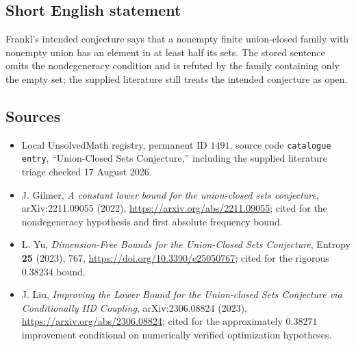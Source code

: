 \documentclass[11pt]{article}
\begin{document}
\subsection{Short English statement}
Frankl's intended conjecture says that a nonempty finite union-closed family with nonempty union has an element in at least half its sets. The stored sentence omits the nondegeneracy condition and is refuted by the family containing only the empty set; the supplied literature still treats the intended conjecture as open.
\subsection{Sources}
\begin{itemize}
\item Local UnsolvedMath registry, permanent ID $1491$, source code \texttt{catalogue entry}, ``Union-Closed Sets Conjecture,'' including the supplied literature triage checked 17 August 2026.
\item J. Gilmer, \emph{A constant lower bound for the union-closed sets conjecture}, arXiv:2211.09055 (2022), \url{https://arxiv.org/abs/2211.09055}; cited for the nondegeneracy hypothesis and first absolute frequency bound.
\item L. Yu, \emph{Dimension-Free Bounds for the Union-Closed Sets Conjecture}, Entropy \textbf{25} (2023), 767, \url{https://doi.org/10.3390/e25050767}; cited for the rigorous $0.38234$ bound.
\item J. Liu, \emph{Improving the Lower Bound for the Union-closed Sets Conjecture via Conditionally IID Coupling}, arXiv:2306.08824 (2023), \url{https://arxiv.org/abs/2306.08824}; cited for the approximately $0.38271$ improvement conditional on numerically verified optimization hypotheses.
\end{itemize}
\end{document}

